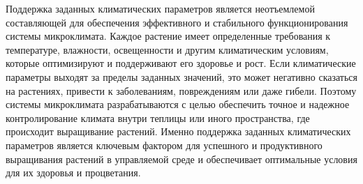 Поддержка заданных климатических параметров является неотъемлемой составляющей для обеспечения эффективного и стабильного функционирования системы микроклимата. Каждое растение имеет определенные требования к температуре, влажности, освещенности и другим климатическим условиям, которые оптимизируют и поддерживают его здоровье и рост. Если климатические параметры выходят за пределы заданных значений, это может негативно сказаться на растениях, привести к заболеваниям, повреждениям или даже гибели. Поэтому системы микроклимата разрабатываются с целью обеспечить точное и надежное контролирование климата внутри теплицы или иного пространства, где происходит выращивание растений. Именно поддержка заданных климатических параметров является ключевым фактором для успешного и продуктивного выращивания растений в управляемой среде и обеспечивает оптимальные условия для их здоровья и процветания.